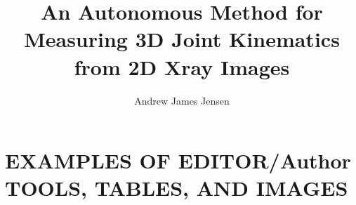 \documentclass[editMode]{ufdissertation}\sloppy
\title{An Autonomous Method for Measuring 3D Joint Kinematics from 2D Xray Images}%
\author{Andrew James Jensen}%
\begin{document}







\chapter{EXAMPLES OF EDITOR/Author TOOLS, TABLES, AND IMAGES}%

\end{document}
